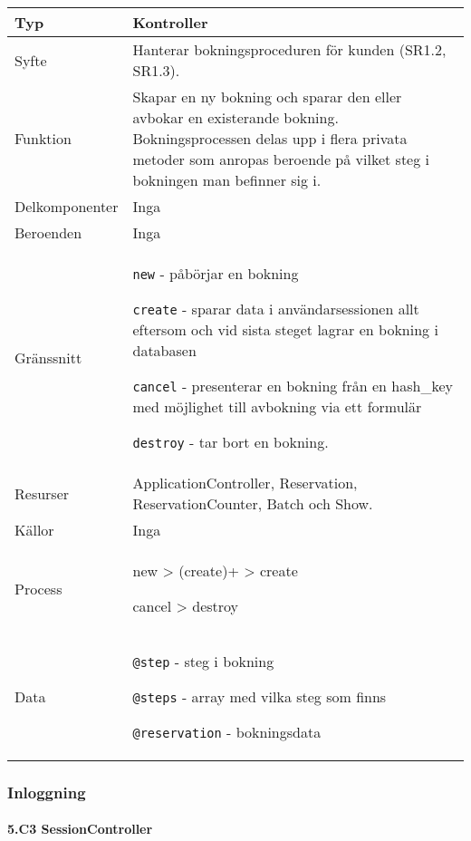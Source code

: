 \documentclass[a4paper, twoside, 11pt, titlepage]{article}
\begin{document}
			\begin {table} [ht] \begin{tabular} {  p{3.5cm} p{9.6cm} }
				\hline
				{Typ} & {Kontroller} \\
				\hline
				{Syfte} & {Hanterar bokningsproceduren för kunden (SR1.2, SR1.3).} \\
				\hline
				{Funktion} & {Skapar en ny bokning och sparar den eller avbokar en existerande bokning. Bokningsprocessen delas upp i flera privata metoder som anropas beroende på vilket steg i bokningen man befinner sig i.} \\
				\hline
				{Delkomponenter} & {Inga} \\
				\hline
				{Beroenden} & {Inga} \\
				\hline
				{Gränssnitt} & {{\tt new} - påbörjar en bokning

{\tt create} - sparar data i användarsessionen allt eftersom och vid sista steget lagrar en bokning i databasen

{\tt cancel} - presenterar en bokning från en hash\_key med möjlighet till avbokning via ett formulär

{\tt destroy} - tar bort en bokning.} \\
				\hline
				{Resurser} & {ApplicationController, Reservation, ReservationCounter, Batch och Show.} \\
				\hline
				{Källor} & {Inga} \\
				\hline
				{Process} & {new > (create)+ > create

cancel > destroy} \\
				\hline
				{Data} & {{\tt @step} - steg i bokning

{\tt @steps} - array med vilka steg som finns

{\tt @reservation} - bokningsdata} \\
				\hline
			\end{tabular} \end{table} \FloatBarrier


		\subsubsection{Inloggning}



			\paragraph{5.C3 SessionController}\
\end{document}
